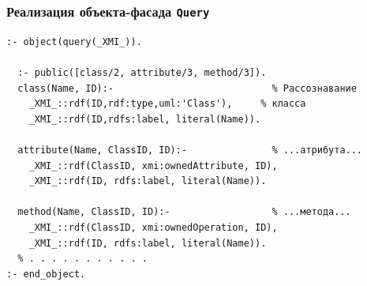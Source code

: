\documentclass[10pt]{beamer}
\begin{document}
\begin{frame}[fragile]
  \frametitle{Реализация объекта-фасада \texttt{Query}}
\begin{verbatim}
:- object(query(_XMI_)).

  :- public([class/2, attribute/3, method/3]).
  class(Name, ID):-                            % Рассознавание
    _XMI_::rdf(ID,rdf:type,uml:'Class'),     % класса
    _XMI_::rdf(ID,rdfs:label, literal(Name)).

  attribute(Name, ClassID, ID):-               % ...атрибута...
    _XMI_::rdf(ClassID, xmi:ownedAttribute, ID),
    _XMI_::rdf(ID, rdfs:label, literal(Name)).

  method(Name, ClassID, ID):-                  % ...метода...
    _XMI_::rdf(ClassID, xmi:ownedOperation, ID),
    _XMI_::rdf(ID, rdfs:label, literal(Name)).
  % . . . . . . . . . . .
:- end_object.
\end{verbatim}
\end{frame}
\end{document}

